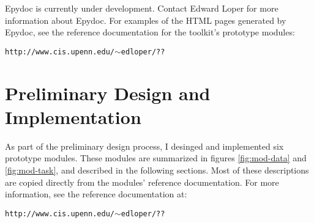 \documentclass{article}
\begin{document}
Epydoc is currently under development.  Contact Edward Loper for more
information about Epydoc.  For examples of the HTML pages generated by 
Epydoc, see the reference documentation for the toolkit's prototype
modules:

 \texttt{http://www.cis.upenn.edu/$\sim$edloper/??}

\section{Preliminary Design and Implementation}

As part of the preliminary design process, I desinged and implemented
six prototype modules.  These modules are summarized in figures
\ref{fig:mod-data} and \ref{fig:mod-task}, and described in the
following sections.  Most of these descriptions are copied directly from
the modules' reference documentation.  For more information, see the
reference documentation at:

 \texttt{http://www.cis.upenn.edu/$\sim$edloper/??}
\end{document}
